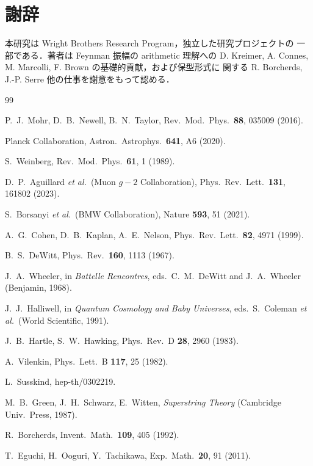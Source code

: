 \documentclass[11pt,a4paper]{article}
\begin{document}
\section*{謝辞}

本研究は Wright Brothers Research Program，独立した研究プロジェクトの
一部である．著者は Feynman 振幅の arithmetic 理解への D. Kreimer,
A. Connes, M. Marcolli, F. Brown の基礎的貢献，および保型形式に
関する R. Borcherds, J.-P. Serre 他の仕事を謝意をもって認める．

\begin{thebibliography}{99}

P.~J.~Mohr, D.~B.~Newell, B.~N.~Taylor, Rev.\ Mod.\ Phys.\ \textbf{88}, 035009 (2016).

Planck Collaboration, Astron.\ Astrophys.\ \textbf{641}, A6 (2020).

S.~Weinberg, Rev.\ Mod.\ Phys.\ \textbf{61}, 1 (1989).

D.~P.~Aguillard \textit{et al.}\ (Muon $g-2$ Collaboration),
Phys.\ Rev.\ Lett.\ \textbf{131}, 161802 (2023).

S.~Borsanyi \textit{et al.}\ (BMW Collaboration),
Nature \textbf{593}, 51 (2021).

A.~G.~Cohen, D.~B.~Kaplan, A.~E.~Nelson,
Phys.\ Rev.\ Lett.\ \textbf{82}, 4971 (1999).

B.~S.~DeWitt, Phys.\ Rev.\ \textbf{160}, 1113 (1967).

J.~A.~Wheeler, in \textit{Battelle Rencontres},
eds.\ C.~M.~DeWitt and J.~A.~Wheeler (Benjamin, 1968).

J.~J.~Halliwell, in \textit{Quantum Cosmology and Baby Universes},
eds.\ S.~Coleman \textit{et al.}\ (World Scientific, 1991).

J.~B.~Hartle, S.~W.~Hawking, Phys.\ Rev.\ D \textbf{28}, 2960 (1983).

A.~Vilenkin, Phys.\ Lett.\ B \textbf{117}, 25 (1982).

L.~Susskind, hep-th/0302219.

M.~B.~Green, J.~H.~Schwarz, E.~Witten, \textit{Superstring Theory}
(Cambridge Univ.\ Press, 1987).

R.~Borcherds, Invent.\ Math.\ \textbf{109}, 405 (1992).

T.~Eguchi, H.~Ooguri, Y.~Tachikawa, Exp.\ Math.\ \textbf{20}, 91 (2011).


\end{thebibliography}
\end{document}
